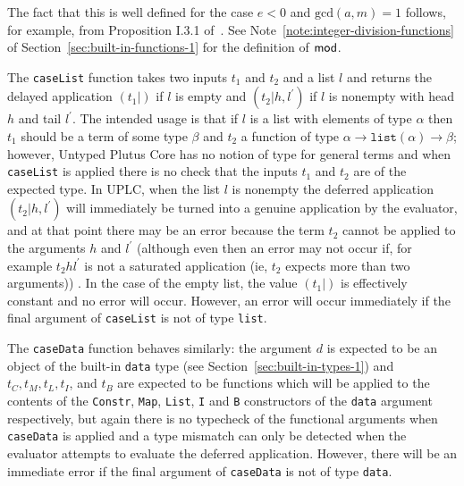 \noindent The fact that this is well defined for the case $e<0$ and $\mathrm{gcd}(a,m) = 1$
follows, for example, from Proposition I.3.1 of~\cite{Koblitz-GTM}.  See
Note~\ref{note:integer-division-functions} of
Section~\ref{sec:built-in-functions-1} for the definition of $\operatorname{\mathsf{mod}}$.

\label{note:case-list-case-data}
The \texttt{caseList} function takes two inputs $t_1$ and $t_2$ and a list $l$
and returns the delayed application $(t_1|)$ if $l$ is empty and
$(t_2|h,l^{\prime})$ if $l$ is nonempty with head $h$ and tail $l^{\prime}$.
The intended usage is that if $l$ is a list with elements of type $\alpha$ then
$t_1$ should be a term of some type $\beta$ and $t_2$ a function of type
$\alpha \rightarrow
\mathtt{list}(\alpha) \rightarrow \beta$; however, Untyped Plutus Core has no notion
of type for general terms and when \texttt{caseList} is applied there is no
check that the inputs $t_1$ and $t_2$ are of the expected type.  In UPLC, when
the list $l$ is nonempty the deferred application $(t_2|h,l^{\prime})$ will
immediately be turned into a genuine application by the evaluator, and at that
point there may be an error because the term $t_2$ cannot be applied to the
arguments $h$ and $l^{\prime}$ (although even then an error may not occur if,
for example $t_2 h l^{\prime}$ is not a saturated application (ie, $t_2$ expects
more than two arguments)) .  In the case of the empty list, the value $(t_1|)$
is effectively constant and no error will occur.  However, an error will occur
immediately if the final argument of \texttt{caseList} is not of
type \texttt{list}.

The \texttt{caseData} function behaves similarly: the argument $d$ is expected
to be an object of the built-in \texttt{data} type (see
Section~\ref{sec:built-in-types-1}) and $t_C, t_M, t_L, t_I$, and $t_B$ are
expected to be functions which will be applied to the contents of
the \texttt{Constr}, \texttt{Map}, \texttt{List}, \texttt{I} and \texttt{B}
constructors of the \texttt{data} argument respectively, but again there is no
typecheck of the functional arguments when \texttt{caseData} is applied and a
type mismatch can only be detected when the evaluator attempts to evaluate the
deferred application.  However, there will be an immediate error if the final
argument of \texttt{caseData} is not of type \texttt{data}.



